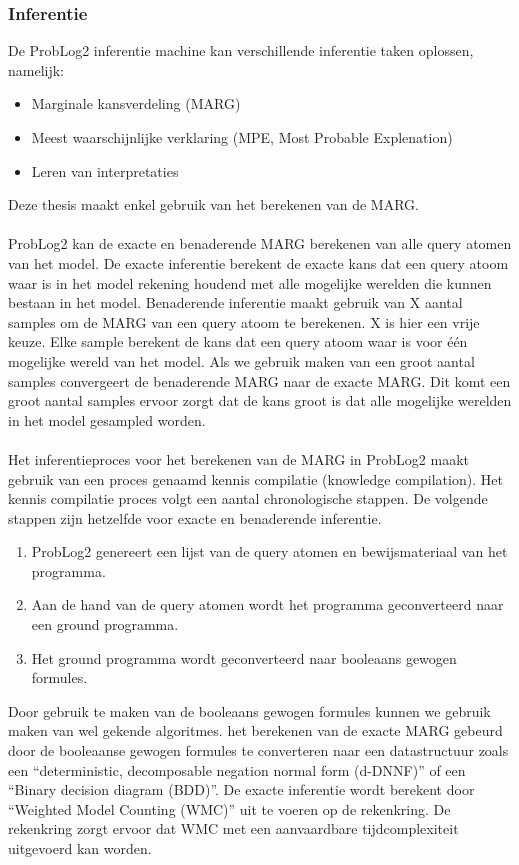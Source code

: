 \documentclass[12pt,a4paper,oneside]{book}
\theoremstyle{definition}
\newcommand{\quotes}[1]{``#1''}
\begin{document}
\subsubsection{Inferentie}
\label{subsubsec:inferentieProbLog2}
De ProbLog2 inferentie machine kan verschillende inferentie taken oplossen, namelijk:
\begin{itemize}
	\item Marginale kansverdeling (MARG)
	\item Meest waarschijnlijke verklaring (MPE, Most Probable Explenation)
	\item Leren van interpretaties
\end{itemize}
Deze thesis maakt enkel gebruik van het berekenen van de MARG.
\\\\
ProbLog2 kan de exacte en benaderende MARG berekenen van alle query atomen van het model. De exacte inferentie berekent de exacte kans dat een query atoom waar is in het model rekening houdend met alle mogelijke werelden die kunnen bestaan in het model. Benaderende inferentie maakt gebruik van X aantal samples om de MARG van een query atoom te berekenen. X is hier een vrije keuze. Elke sample berekent de kans dat een query atoom waar is voor \'{e}\'{e}n mogelijke wereld van het model. Als we gebruik maken van een groot aantal samples convergeert de benaderende MARG naar de exacte MARG. Dit komt een groot aantal samples ervoor zorgt dat de kans groot is dat alle mogelijke werelden in het model gesampled worden.
\\\\
Het inferentieproces voor het berekenen van de MARG in ProbLog2 maakt gebruik van een proces genaamd kennis compilatie (knowledge compilation). Het kennis compilatie proces volgt een aantal chronologische stappen. De volgende stappen zijn hetzelfde voor exacte en benaderende inferentie.
\begin{enumerate}
	\item ProbLog2 genereert een lijst van de query atomen en bewijsmateriaal van het programma.
	\item Aan de hand van de query atomen wordt het programma geconverteerd naar een ground programma.
	\item Het ground programma wordt geconverteerd naar booleaans gewogen formules.
\end{enumerate}
Door gebruik te maken van de booleaans gewogen formules kunnen we gebruik maken van wel gekende algoritmes. het berekenen van de exacte MARG gebeurd door de booleaanse gewogen formules te converteren naar een datastructuur zoals een \quotes{deterministic, decomposable negation normal form (d-DNNF)} of een \quotes{Binary decision diagram (BDD)}. De exacte inferentie wordt berekent door \quotes{Weighted Model Counting (WMC)} uit te voeren op de rekenkring. De rekenkring zorgt ervoor dat WMC met een aanvaardbare tijdcomplexiteit uitgevoerd kan worden.
\end{document}
